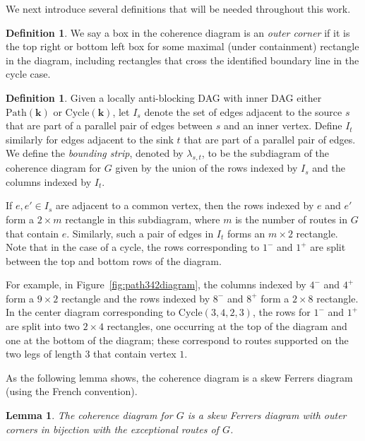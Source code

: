 \documentclass[12pt]{amsart}
\newtheorem{lemma}[theorem]{Lemma}
\theoremstyle{definition}
\newtheorem{definition}[theorem]{Definition}
\newcommand{\defn}[1]{\emph{\color{blue} #1}}
\newcommand\bk{\mathbf{k}}
\newcommand\Path{\mathrm{Path}}
\newcommand\Cycle{\mathrm{Cycle}}
\begin{document}
We next introduce several definitions that will be needed throughout this work.

\begin{definition}\label{def:outercorner}
We say a box in the coherence diagram is an \defn{outer corner} if it is the top right or bottom left box for some maximal (under containment) rectangle in the diagram, including rectangles that cross the identified boundary line in the cycle case.    
\end{definition}

\begin{definition}\label{def:boundingstrip}
Given a locally anti-blocking DAG with inner DAG either $\Path(\bk)$ or $\Cycle(\bk)$, let $I_s$ denote the set of edges adjacent to the source $s$ that are part of a parallel pair of edges between $s$ and an inner vertex.
Define $I_t$ similarly for edges adjacent to the sink $t$ that are part of a parallel pair of edges.
We define the \defn{bounding strip}, denoted by $\lambda_{s,t}$, to be the subdiagram of the coherence diagram for $G$ given by the union of the rows indexed by $I_s$ and the columns indexed by $I_t$.
\end{definition}

If $e, e'\in I_s$ are adjacent to a common vertex, then the rows indexed by $e$ and $e'$ form a $2\times m$ rectangle in this subdiagram, where $m$ is the number of routes in $G$ that contain $e$.
Similarly, such a pair of edges in $I_t$ forms an $m\times 2$ rectangle.
Note that in the case of a cycle, the rows corresponding to $1^-$ and $1^+$ are split between the top and bottom rows of the diagram.

For example, in Figure~\ref{fig:path342diagram}, the columns indexed by $4^-$ and $4^+$ form a $9\times 2$ rectangle and the rows indexed by $8^-$ and $8^+$ form a $2\times 8$ rectangle.
In the center diagram corresponding to $\Cycle(3,4,2,3)$, the rows for $1^-$ and $1^+$ are split into two $2\times 4$ rectangles, one occurring at the top of the diagram and one at the bottom of the diagram; these correspond to routes supported on the two legs of length $3$ that contain vertex $1$.

As the following lemma shows, the coherence diagram is a skew Ferrers diagram (using the French convention).

\begin{lemma}\label{lem:outercorners}
The coherence diagram for $G$ is a skew Ferrers diagram with outer corners in bijection with the exceptional routes of $G$.
\end{lemma}
\end{document}
